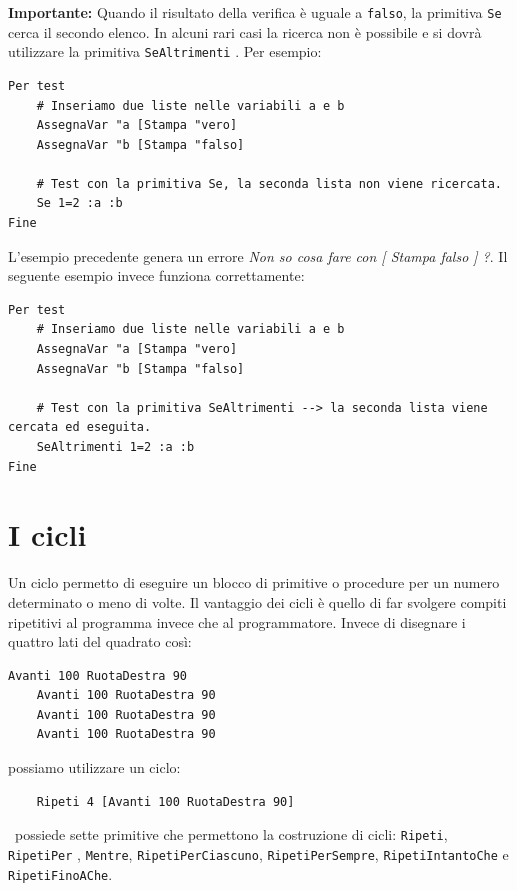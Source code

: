 \vspace{0.2cm}
\textbf{Importante:} Quando il risultato della verifica è uguale a \texttt{falso}, la primitiva \texttt{Se} cerca il secondo elenco. In alcuni rari casi la ricerca non è possibile e si dovrà utilizzare la primitiva \texttt{SeAltrimenti} . Per esempio:
\begin{lstlisting}[caption="Uso della primitiva \texttt{Se} non corretto"]
Per test
	# Inseriamo due liste nelle variabili a e b
	AssegnaVar "a [Stampa "vero]
	AssegnaVar "b [Stampa "falso]

	# Test con la primitiva Se, la seconda lista non viene ricercata.
	Se 1=2 :a :b
Fine
\end{lstlisting}
L'esempio precedente genera un errore \textit{Non so cosa fare con [ Stampa \textquotedbl falso ]  ?}. Il seguente esempio invece funziona correttamente:
\begin{lstlisting}[caption="Uso della primitiva \texttt{SeAltrimenti} corretto"]
Per test
	# Inseriamo due liste nelle variabili a e b
	AssegnaVar "a [Stampa "vero]
	AssegnaVar "b [Stampa "falso]

	# Test con la primitiva SeAltrimenti --> la seconda lista viene cercata ed eseguita.
	SeAltrimenti 1=2 :a :b
Fine
\end{lstlisting}



\section{I cicli}
Un ciclo permetto di eseguire un blocco di primitive o procedure per un numero determinato o meno di volte. Il vantaggio dei cicli è quello di far svolgere compiti ripetitivi al programma invece che al programmatore.
Invece di disegnare i quattro lati del quadrato così:
\begin{lstlisting}[caption="Un semplice quadrato"]
	Avanti 100 RuotaDestra 90
	Avanti 100 RuotaDestra 90
	Avanti 100 RuotaDestra 90
	Avanti 100 RuotaDestra 90
\end{lstlisting}
possiamo utilizzare un ciclo:
\begin{lstlisting}
	Ripeti 4 [Avanti 100 RuotaDestra 90]
\end{lstlisting}

\xlogo\ possiede sette primitive che permettono la costruzione di cicli: \texttt{Ripeti}, \texttt{RipetiPer} , \texttt{Mentre}, \texttt{RipetiPerCiascuno}, \texttt{RipetiPerSempre}, \texttt{RipetiIntantoChe} e \texttt{RipetiFinoAChe}.


